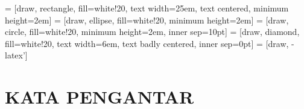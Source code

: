 \documentclass[12pt, a4paper, onecolumn, oneside, final]{report}
\theoremstyle{definition}
\numberwithin{equation}{chapter}
\begin{document}
 = [draw, rectangle, fill=white!20, text width=25em, text centered, minimum height=2em]%
 = [draw, ellipse, fill=white!20, minimum height=2em]
 = [draw, circle, fill=white!20, minimum height=2em, inner sep=10pt]
 = [draw, diamond, fill=white!20, text width=6em, text badly centered, inner sep=0pt]
 = [draw, -latex']

%
%
%
%
\pagebreak
\chapter*{KATA PENGANTAR}	

\pagebreak
\end{document}
